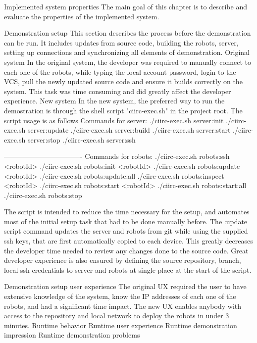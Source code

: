 \chap Implemented system properties
The main goal of this chapter is to describe and evaluate the properties of the implemented system.

\sec Demonstration setup
This section describes the process before the demonstration can be run. It includes updates from source code, building the robots, server, setting up connections and synchronizing all elements of demonstration.
\secc Original system
In the original system, the developer was required to manually connect to each one of the robots, while typing the local account password, login to the VCS, pull the newly updated source code and ensure it builds correctly on the system. This task was time consuming and did greatly affect the developer experience.
\secc New system
In the new system, the preferred way to run the demostration is through the shell script "ciirc-exec.sh" in the project root. The script usage is as follows
\begtt
Commands for server:
./ciirc-exec.sh server:init
./ciirc-exec.sh server:update
./ciirc-exec.sh server:build
./ciirc-exec.sh server:start
./ciirc-exec.sh server:stop
./ciirc-exec.sh server:ssh

----------------------------------
Commands for robots:
./ciirc-exec.sh robots:ssh <robotId>
./ciirc-exec.sh robots:init <robotId>
./ciirc-exec.sh robots:update <robotId>
./ciirc-exec.sh robots:update:all
./ciirc-exec.sh robots:inspect <robotId>
./ciirc-exec.sh robots:start <robotId>
./ciirc-exec.sh robots:start:all
./ciirc-exec.sh robots:stop
\endtt

The script is intended to reduce the time necessary for the setup, and automates most of the initial setup task that had to be done manually before. The :update script command updates the server and robots from git while using the supplied ssh keys, that are first automatically copied to each device. This greatly decreases the developer time needed to review any changes done to the source code. Great developer experience is also ensured by defining the source repository, branch, local ssh credentials to server and robots at single place at the start of the script.

\sec Demonstration setup user experience
The original UX required the user to have extensive knowledge of the system, know the IP addresses of each one of the robots, and had a significant time impact. The new UX enables anybody with access to the repository and local network to deploy the robots in under 3 minutes.
\sec Runtime behavior
\sec Runtime user experience
\sec Runtime demonstration impression
\sec Runtime demonstration problems